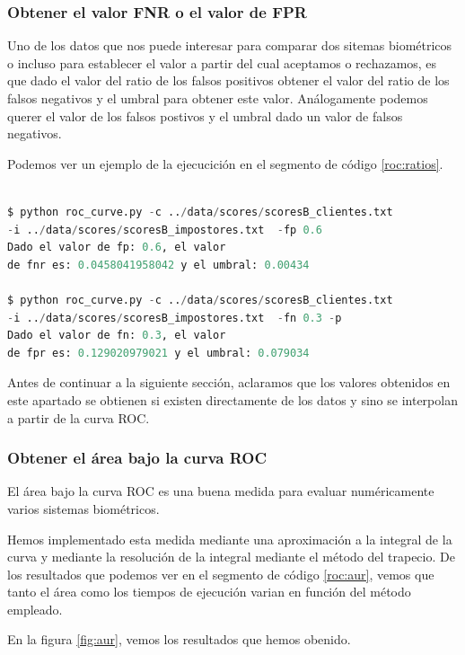 \subsubsection{Obtener el valor FNR o el valor de FPR}
Uno de los datos que nos puede interesar para comparar dos sitemas biométricos o incluso para establecer el valor a partir del cual aceptamos o rechazamos, es que dado el valor del ratio de los falsos positivos obtener el valor del  ratio de los falsos negativos y el umbral para obtener este valor. Análogamente podemos querer el valor de los falsos postivos y el umbral dado un valor de falsos negativos.\par
Podemos ver un ejemplo de la ejecucición en el segmento de código \ref{roc:ratios}.\par

\begin{lstlisting}[language=python,label=roc:ratios,caption=Obtención de ratios y umbrales]

$ python roc_curve.py -c ../data/scores/scoresB_clientes.txt 
-i ../data/scores/scoresB_impostores.txt  -fp 0.6   
Dado el valor de fp: 0.6, el valor 
de fnr es: 0.0458041958042 y el umbral: 0.00434 

$ python roc_curve.py -c ../data/scores/scoresB_clientes.txt 
-i ../data/scores/scoresB_impostores.txt  -fn 0.3 -p
Dado el valor de fn: 0.3, el valor 
de fpr es: 0.129020979021 y el umbral: 0.079034 

\end{lstlisting}

Antes de continuar a la siguiente sección, aclaramos que los valores obtenidos en este apartado se obtienen si existen directamente de los datos y sino se interpolan a partir de la curva ROC.\par

\subsubsection{Obtener el área bajo la curva ROC}

El área bajo la curva ROC es una buena medida para evaluar numéricamente varios sistemas biométricos.\par
Hemos implementado esta medida mediante una aproximación a la integral de la curva y mediante la resolución de la integral mediante el método del trapecio. De los resultados que podemos ver en el segmento de código \ref{roc:aur}, vemos que tanto el área como los tiempos de ejecución varian en función del método empleado.\par
En la figura \ref{fig:aur}, vemos los resultados que hemos obenido.

